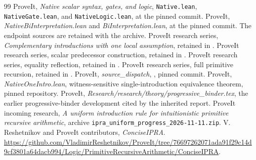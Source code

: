 \documentclass[11pt,a4paper]{article}
\theoremstyle{definition}\newtheorem{definition}[theorem]{Definition}
\begin{document}
\begin{thebibliography}{99}
 ProveIt, \emph{Native scalar syntax, gates, and logic},
\texttt{Native.lean}, \texttt{NativeGate.lean}, and \texttt{NativeLogic.lean},
at the pinned commit.
 ProveIt, \emph{NativeBiInterpretation.lean} and
\emph{BiInterpretation.lean}, at the pinned commit. The endpoint sources
are retained with the archive.
 ProveIt research series, \emph{Complementary introductions
with one local assumption}, retained in
.
 ProveIt research series, scalar predecessor construction,
retained in .
 ProveIt research series, equality reflection,
retained in .
 ProveIt research series, full primitive recursion,
retained in .
 ProveIt, \emph{source\_dispatch},
, pinned commit.
 ProveIt, \emph{NativeOneIntro.lean}, witness-sensitive
single-introduction equivalence theorem, pinned repository.
 ProveIt, \emph{Research/research/theory/progressive\_binder.tex},
the earlier progressive-binder development cited by the inherited report.
 ProveIt incoming research, \emph{A uniform introduction
rule for intuitionistic primitive recursive arithmetic}, archive
\texttt{ipra\_uniform\_progress\_2026-11-11.zip}.
 V. Reshetnikov and ProveIt contributors, \emph{ConciseIPRA}.
\url{https://github.com/VladimirReshetnikov/ProveIt/tree/76697262071ada91f29c14d9cf3801a64dacb994/Logic/PrimitiveRecursiveArithmetic/ConciseIPRA}.
\end{thebibliography}
\end{document}
